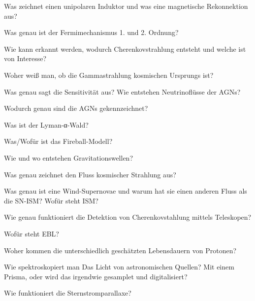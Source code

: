 \begin{frame}
  Was zeichnet einen unipolaren Induktor und was eine magnetische Rekonnektion aus?

  Was genau ist der Fermimechanismus 1. und 2. Ordnung?

  Wie kann erkannt werden, wodurch Cherenkovstrahlung entsteht und welche ist von Interesse?

  Woher weiß man, ob die Gammastrahlung kosmischen Ursprungs ist?

  Was genau sagt die Sensitivität aus?
  Wie entstehen Neutrinoflüsse der AGNs?

  Wodurch genau sind die AGNs gekennzeichnet?

  Was ist der Lyman-α-Wald?

  Was/Wofür ist das Fireball-Modell?

  Wie und wo entstehen Gravitationswellen?

  Was genau zeichnet den Fluss kosmischer Strahlung aus?

  Was genau ist eine Wind-Supernovae und warum hat sie einen anderen Fluss als die SN-ISM? Wofür steht ISM?

  Wie genau funktioniert die Detektion von Cherenkovstahlung mittels Teleskopen?

  Wofür steht EBL?

  Woher kommen die unterschiedlich geschätzten Lebensdauern von Protonen?

  Wie spektroskopiert man Das Licht von astronomischen Quellen? Mit einem Prisma, oder wird das irgendwie gesamplet und digitalisiert?

  Wie funktioniert die Sternstromparallaxe?

\end{frame}
